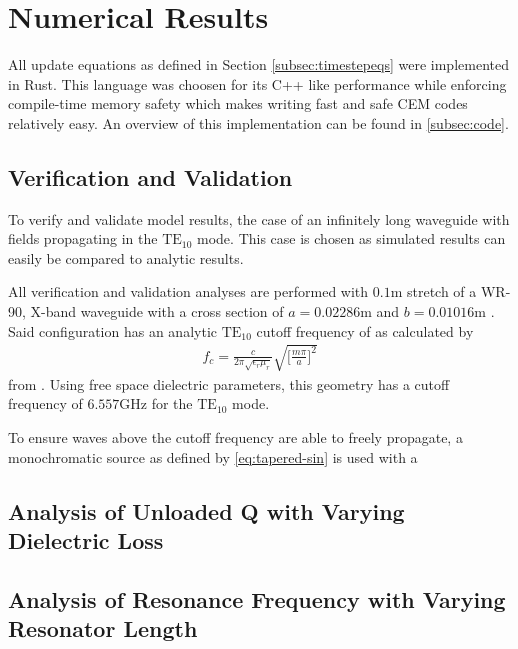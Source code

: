 \section{Numerical Results}
\label{sec:numres} 
All update equations as defined in Section \ref{subsec:timestepeqs} were implemented in Rust. This language was choosen for its C++ like performance while enforcing compile-time memory safety which makes writing fast and safe CEM codes relatively easy. An overview of this implementation can be found in \ref{subsec:code}.

\subsection{Verification and Validation}
\label{subsec:vv}
To verify and validate model results, the case of an infinitely long waveguide with fields propagating in the $\mathrm{TE_{10}}$ mode. This case is chosen as simulated results can easily be compared to analytic results.

All verification and validation analyses are performed with $0.1$m stretch of a WR-90, X-band waveguide with a cross section of $a=0.02286$m and $b=0.01016$m \cite{everythingrf}. Said configuration has an analytic $\mathrm{TE_{10}}$ cutoff frequency of as calculated by
\begin{align}
    f_c=\frac{c}{2\pi\sqrt{\epsilon_r\mu_r}}\sqrt{\bigg[\frac{m\pi}{a}\bigg]^2}
    \label{eq:analytic-cutoff}
\end{align}
from \cite{pozar2011microwave}. Using free space dielectric parameters, this geometry has a cutoff frequency of $6.557$GHz for the $\mathrm{TE_{10}}$ mode.

To ensure waves above the cutoff frequency are able to freely propagate, a monochromatic source as defined by \ref{eq:tapered-sin} is used with a 

\subsection{Analysis of Unloaded Q with Varying Dielectric Loss}
\label{subsec:dielectric-loss}

\subsection{Analysis of Resonance Frequency with Varying Resonator Length}
\label{subsec:resonance-length}
